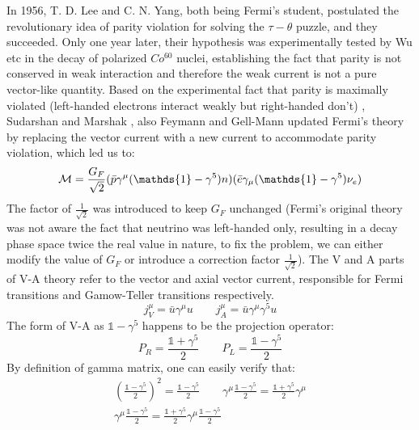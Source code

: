 In 1956, T. D. Lee and C. N. Yang, both being Fermi's student, postulated the
revolutionary idea of parity violation for solving the $\tau-\theta$ puzzle, 
and they succeeded. Only one year later, their hypothesis was experimentally tested
by Wu etc in the decay of polarized $Co^{60}$ nuclei, establishing the fact
that parity is not conserved in weak interaction and therefore the weak 
current is not a pure vector-like quantity. 
Based on the experimental fact that parity is maximally violated (left-handed 
electrons interact weakly but right-handed don't) \cite{PhysRev.109.1015}, 
Sudarshan and Marshak \cite{PhysRev.109.1860.2}, also Feymann and Gell-Mann \cite{PhysRev.109.193}
updated Fermi's theory by replacing the vector current with a new current to 
accommodate parity violation, which led us to:
\begin{equation}
    \CM = \frac{G_F}{\sqrt{2}}(\bar{p} \gamma^\mu(\mathds{1} - \gamma^5) n) (\bar{e} \gamma_\mu(\mathds{1} - \gamma^5) \nu_e)
\end{equation}
The factor of $\frac{1}{\sqrt{2}}$ was introduced to keep $G_F$ unchanged (Fermi's
original theory was not aware the fact that neutrino was left-handed only, resulting
in a decay phase space twice the real value in nature, to fix the problem, we can
either modify the value of $G_F$ or introduce a correction factor $\frac{1}{\sqrt{2}}$).
The V and A parts of V-A theory refer to the vector and axial vector current, 
responsible for Fermi transitions and Gamow-Teller transitions respectively.
\begin{equation}
    j_V^\mu = \bar{u}\gamma^\mu u   \qquad 
    j_A^\mu = \bar{u}\gamma^\mu\gamma^5 u   
\end{equation}
The form of V-A as $\mathds{1} - \gamma^5$ happens to be the projection operator:
\begin{equation}
    P_R = \frac{\mathds{1} + \gamma^5}{2}   \qquad P_L = \frac{\mathds{1} - \gamma^5}{2}
\end{equation}
By definition of gamma matrix, one can easily verify that:
\begin{equation}
    \begin{gathered}
	\left(\frac{\mathds{1} - \gamma^5}{2} \right)^2 = \frac{\mathds{1} - \gamma^5}{2} 
	\qquad 
	\gamma^\mu \frac{\mathds{1} - \gamma^5}{2} = \frac{\mathds{1} + \gamma^5}{2} \gamma^\mu \\
	\gamma^\mu \frac{\mathds{1} - \gamma^5}{2} = \frac{\mathds{1} + \gamma^5}{2} \gamma^\mu \frac{\mathds{1}-\gamma^5}{2}
    \end{gathered}
\end{equation}
